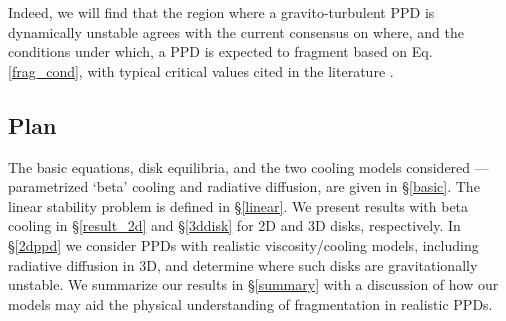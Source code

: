 \documentclass[iop, numberedappendix]{emulateapj}
\begin{document}
Indeed, we will find that the region where a gravito-turbulent PPD is
dynamically unstable agrees with the current consensus on  where, and
the conditions under which, a PPD is expected to fragment based on
Eq. \ref{frag_cond}, with typical critical values cited in the
literature \citep[e.g. $\beta_c\sim
  3,\,\alpha_c\sim0.1$;][]{gammie01,rice05}.    
   

\subsection{Plan}

The basic equations, disk equilibria, and the two cooling models  
considered --- parametrized `beta' cooling and radiative diffusion, 
are given in \S\ref{basic}. 
The linear stability problem is defined in
\S\ref{linear}. We present results with beta cooling in
\S\ref{result_2d} and \S\ref{3ddisk} for 2D and 3D disks,
respectively. %
In \S\ref{2dppd} we consider PPDs with realistic viscosity/cooling   
models, including radiative diffusion in 3D, and determine where such
disks are gravitationally unstable. We summarize our results in
\S\ref{summary} with a discussion of how our models may aid the 
physical understanding of fragmentation in realistic PPDs.   





 




\appendix




\end{document}

